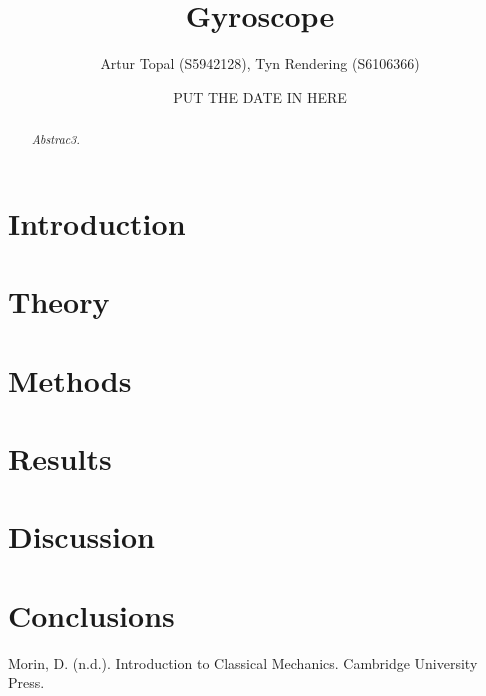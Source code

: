 \documentclass[a4paper,12pt]{article}
\title{Gyroscope}
\author{Artur Topal (S5942128), Tyn Rendering (S6106366)}
\date{PUT THE DATE IN HERE}
\begin{document}
\begin{titlingpage}
  \centering
  \maketitle
  \vspace{2cm}
  \begin{abstract}
  \textit{Abstrac3.}
\end{abstract}

\end{titlingpage}

\break
\tableofcontents
\break
\section{Introduction} \label{sec:introduction}


\section{Theory} \label{sec:theory}


\section{Methods} \label{sec:methods}


\section{Results} \label{sec:results}


\section{Discussion} \label{sec:discussion}


\section{Conclusions} \label{sec:conclusions}



\begin{thebibliography}{99}

Morin, D. (n.d.). Introduction to Classical Mechanics. Cambridge University Press.
  
\end{thebibliography}
\end{document}
